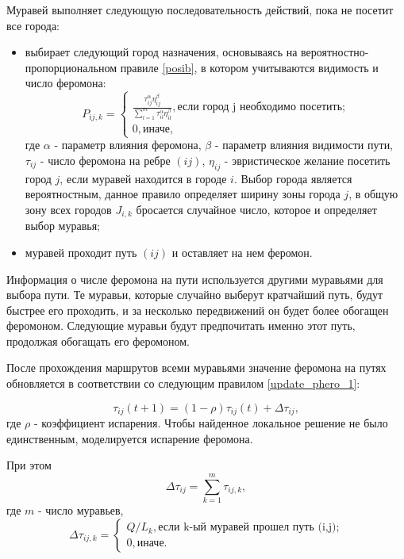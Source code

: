 Муравей выполняет следующую последовательность действий, пока не посетит все города:
\begin{itemize}[label*=---]
	\item выбирает следующий город назначения, основываясь на вероятностно-пропорциональном правиле \eqref{posib}, в котором учитываются видимость и число феромона:
	\begin{equation}
		\label{posib}
		P_{ij, k} = \begin{cases}
			\frac{\tau_{ij}^\alpha\eta_{ij}^\beta}{\sum_{l=1}^m \tau^\alpha_{il}\eta^\beta_{il}}, \textrm{если город j необходимо посетить;} \\
			0, \textrm{иначе,}
		\end{cases}
	\end{equation}
	где $\alpha$ - параметр влияния феромона, $\beta$ - параметр влияния видимости пути, $\tau_{ij}$ - число феромона на ребре $(ij)$, $\eta_{ij}$ - эвристическое желание посетить город $j$, если муравей находится в городе $i$. Выбор города является вероятностным, данное правило определяет ширину зоны города $j$, в общую зону всех городов $J_{i,k}$ бросается случайное число, которое и определяет выбор муравья;
	\item муравей проходит путь $(ij)$ и оставляет на нем феромон.
\end{itemize}

Информация о числе феромона на пути используется другими муравьями для выбора пути. Те муравьи, которые случайно выберут кратчайший путь, будут быстрее его проходить, и за несколько передвижений он будет более обогащен феромоном. Следующие муравьи будут предпочитать именно этот путь, продолжая обогащать его феромоном. 

После прохождения маршрутов всеми муравьями значение феромона на путях обновляется в соответствии со следующим правилом \eqref{update_phero_1}:

\begin{equation}
	\label{update_phero_1}
	\tau_{ij}(t+1) = (1-\rho)\tau_{ij}(t) + \Delta \tau_{ij},
\end{equation}
где $\rho$ - коэффициент испарения. Чтобы найденное локальное решение не было единственным, моделируется испарение феромона.

При этом
\begin{equation}
	\label{update_phero_2}
	\Delta \tau_{ij} = \sum_{k=1}^m \tau_{ij, k},
\end{equation}
где $m$ - число муравьев,
\begin{equation}
	\label{update_phero_3}
	\Delta\tau_{ij,k} = \begin{cases}
		Q/L_{k}, \textrm{если k-ый муравей прошел путь (i,j);} \\
		0, \textrm{иначе.}
	\end{cases}
\end{equation}

